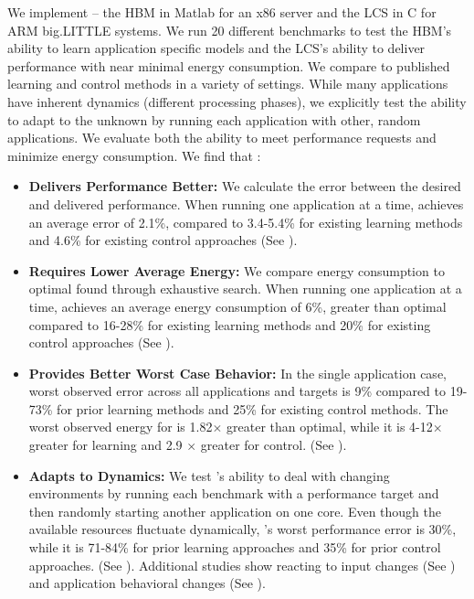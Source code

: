We implement \SYSTEM{} -- the HBM in Matlab for an x86 server and the
LCS in C for ARM big.LITTLE systems.  We run 20 different benchmarks
to test the HBM's ability to learn application specific models and the
LCS's ability to deliver performance with near minimal energy
consumption.  We compare to published learning and control methods in
a variety of settings.  While many applications have inherent dynamics
(\ie different processing phases), we explicitly test the ability to
adapt to the unknown by running each application with other, random
applications.  We evaluate both the ability to meet performance
requests and minimize energy consumption.  We find that \SYSTEM{}:
\begin{itemize}
\item \textbf{Delivers Performance Better: } We calculate the error
  between the desired and delivered performance.  When running one
  application at a time, \SYSTEM{} achieves an average error of 2.1\%,
  compared to 3.4-5.4\% for existing learning methods and 4.6\% for
  existing control approaches (See \secref{}).  
\item \textbf{Requires Lower Average Energy:} We compare energy
  consumption to optimal found through exhaustive search.  When
  running one application at a time, \SYSTEM{} achieves an average
  energy consumption of 6\%, greater than optimal compared to 16-28\%
  for existing learning methods and 20\% for existing control
  approaches (See \secref{}).
\item \textbf{Provides Better Worst Case Behavior:} In the single
  application case, \SYSTEM{} worst observed error across all
  applications and targets is 9\% compared to 19-73\% for prior
  learning methods and 25\% for existing control methods.  The worst
  observed energy for \SYSTEM{} is 1.82$\times$ greater than optimal,
  while it is 4-12$\times$ greater for learning and 2.9 $\times$
  greater for control. (See \secref{}).
\item \textbf{Adapts to Dynamics:} We test \SYSTEM{}'s ability to deal
  with changing environments by running each benchmark with a
  performance target and then randomly starting another application on
  one core.  Even though the available resources fluctuate
  dynamically, \SYSTEM{}'s worst performance error is 30\%, while it
  is 71-84\% for prior learning approaches and 35\% for prior control
  approaches.  (See \secref{}).  Additional studies show \SYSTEM{}
  reacting to input changes (See \secref{}) and application behavioral
  changes (See \secref{}).
\end{itemize}
